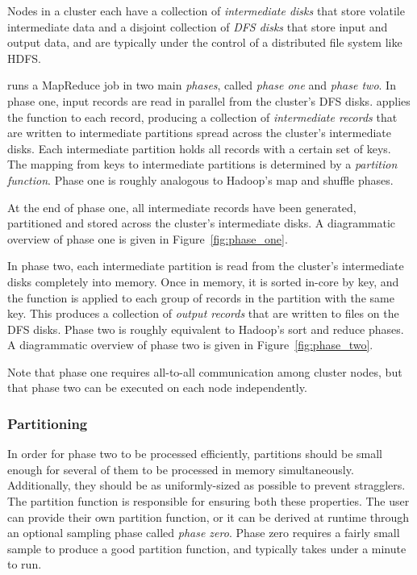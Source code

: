 Nodes in a \themis cluster each have a collection of \emph{intermediate disks}
that store volatile intermediate data and a disjoint collection of \emph{DFS
  disks} that store input and output data, and are typically under the control
of a distributed file system like HDFS.

\themis runs a MapReduce job in two main \emph{phases}, called \emph{phase one}
and \emph{phase two}.  In phase one, input records are read in parallel from
the cluster's DFS disks. \themis applies the \map function to each record,
producing a collection of \emph{intermediate records} that are written to
intermediate partitions spread across the cluster's intermediate disks. Each
intermediate partition holds all records with a certain set of keys. The
mapping from keys to intermediate partitions is determined by a \emph{partition
  function}. Phase one is roughly analogous to Hadoop's map and shuffle phases.

At the end of phase one, all intermediate records have been generated,
partitioned and stored across the cluster's intermediate disks. A diagrammatic
overview of phase one is given in Figure~\ref{fig:phase_one}.

In phase two, each intermediate partition is read from the cluster's
intermediate disks completely into memory. Once in memory, it is sorted in-core
by key, and the \reduce function is applied to each group of records in the
partition with the same key. This produces a collection of \emph{output
  records} that are written to files on the DFS disks. Phase two is roughly
equivalent to Hadoop's sort and reduce phases. A diagrammatic overview of phase
two is given in Figure~\ref{fig:phase_two}.

Note that phase one requires all-to-all communication among cluster nodes, but
that phase two can be executed on each node independently.

\subsubsection{Partitioning}

In order for phase two to be processed efficiently, partitions should be small
enough for several of them to be processed in memory
simultaneously. Additionally, they should be as uniformly-sized as possible to
prevent stragglers. The partition function is responsible for ensuring both
these properties. The user can provide their own partition function, or it can
be derived at runtime through an optional sampling phase called \emph{phase
  zero}. Phase zero requires a fairly small sample to produce a good partition
function, and typically takes under a minute to run.

